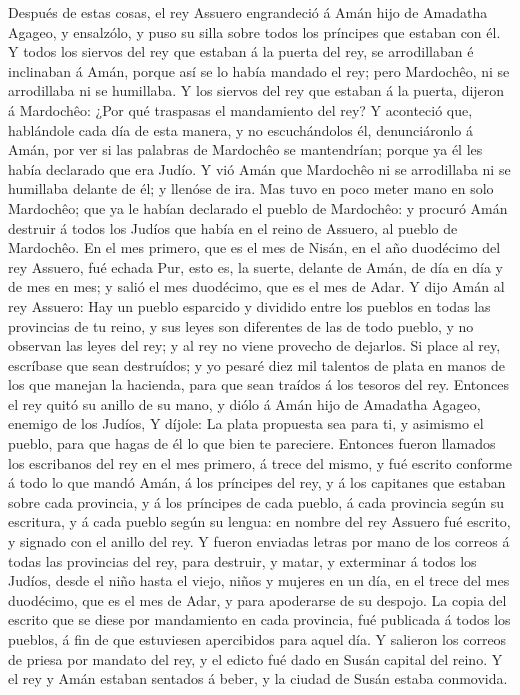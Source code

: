  Después de estas cosas, el rey Assuero engrandeció á Amán
hijo de Amadatha Agageo, y ensalzólo, y puso su silla sobre todos los
príncipes que estaban con él.  Y todos los siervos del rey
que estaban á la puerta del rey, se arrodillaban é inclinaban á Amán,
porque así se lo había mandado el rey; pero Mardochêo, ni se arrodillaba
ni se humillaba.  Y los siervos del rey que estaban á la
puerta, dijeron á Mardochêo: ¿Por qué traspasas el mandamiento del rey?
 Y aconteció que, hablándole cada día de esta manera, y no
escuchándolos él, denunciáronlo á Amán, por ver si las palabras de
Mardochêo se mantendrían; porque ya él les había declarado que era
Judío.  Y vió Amán que Mardochêo ni se arrodillaba ni se
humillaba delante de él; y llenóse de ira.  Mas tuvo en
poco meter mano en solo Mardochêo; que ya le habían declarado el pueblo
de Mardochêo: y procuró Amán destruir á todos los Judíos que había en el
reino de Assuero, al pueblo de Mardochêo.  En el mes
primero, que es el mes de Nisán, en el año duodécimo del rey Assuero,
fué echada Pur, esto es, la suerte, delante de Amán, de día en día y de
mes en mes; y salió el mes duodécimo, que es el mes de Adar.
 Y dijo Amán al rey Assuero: Hay un pueblo esparcido y
dividido entre los pueblos en todas las provincias de tu reino, y sus
leyes son diferentes de las de todo pueblo, y no observan las leyes del
rey; y al rey no viene provecho de dejarlos.  Si place al
rey, escríbase que sean destruídos; y yo pesaré diez mil talentos de
plata en manos de los que manejan la hacienda, para que sean traídos á
los tesoros del rey.  Entonces el rey quitó su anillo de
su mano, y diólo á Amán hijo de Amadatha Agageo, enemigo de los Judíos,
 Y díjole: La plata propuesta sea para ti, y asimismo el
pueblo, para que hagas de él lo que bien te pareciere. 
Entonces fueron llamados los escribanos del rey en el mes primero, á
trece del mismo, y fué escrito conforme á todo lo que mandó Amán, á los
príncipes del rey, y á los capitanes que estaban sobre cada provincia, y
á los príncipes de cada pueblo, á cada provincia según su escritura, y á
cada pueblo según su lengua: en nombre del rey Assuero fué escrito, y
signado con el anillo del rey.  Y fueron enviadas letras
por mano de los correos á todas las provincias del rey, para destruir, y
matar, y exterminar á todos los Judíos, desde el niño hasta el viejo,
niños y mujeres en un día, en el trece del mes duodécimo, que es el mes
de Adar, y para apoderarse de su despojo.  La copia del
escrito que se diese por mandamiento en cada provincia, fué publicada á
todos los pueblos, á fin de que estuviesen apercibidos para aquel día.
 Y salieron los correos de priesa por mandato del rey, y
el edicto fué dado en Susán capital del reino. Y el rey y Amán estaban
sentados á beber, y la ciudad de Susán estaba conmovida.

